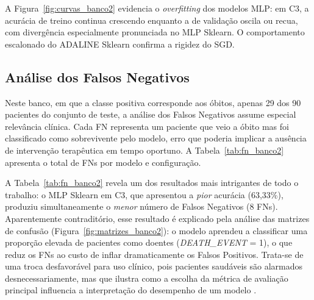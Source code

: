 A Figura~\ref{fig:curvas_banco2} evidencia o \textit{overfitting} dos modelos MLP: em C3, a acurácia de treino continua crescendo enquanto a de validação oscila ou recua, com divergência especialmente pronunciada no MLP Sklearn. O comportamento escalonado do ADALINE Sklearn confirma a rigidez do SGD.

\subsection{Análise dos Falsos Negativos}
\label{sec:banco2_fn}

Neste banco, em que a classe positiva corresponde aos óbitos, apenas 29 dos 90 pacientes do conjunto de teste, a análise dos Falsos Negativos assume especial relevância clínica. Cada FN representa um paciente que veio a óbito mas foi classificado como sobrevivente pelo modelo, erro que poderia implicar a ausência de intervenção terapêutica em tempo oportuno. A Tabela~\ref{tab:fn_banco2} apresenta o total de FNs por modelo e configuração.

\begin{table}[H]
\centering
\caption[Falsos Negativos dos modelos no Banco 2 por configuração]{Total de Falsos Negativos (FN) dos modelos no Banco 2 por configuração de treinamento. Conjunto de teste: 90 pacientes (29 óbitos / 61 sobreviventes).}
\label{tab:fn_banco2}
\end{table}

A Tabela~\ref{tab:fn_banco2} revela um dos resultados mais intrigantes de todo o trabalho: o MLP Sklearn em C3, que apresentou a \textit{pior} acurácia (63,33\%), produziu simultaneamente o \textit{menor} número de Falsos Negativos (8 FNs). Aparentemente contraditório, esse resultado é explicado pela análise das matrizes de confusão (Figura~\ref{fig:matrizes_banco2}): o modelo aprendeu a classificar uma proporção elevada de pacientes como doentes (\textit{DEATH\_EVENT} = 1), o que reduz os FNs ao custo de inflar dramaticamente os Falsos Positivos. Trata-se de uma troca desfavorável para uso clínico, pois pacientes saudáveis são alarmados desnecessariamente, mas que ilustra como a escolha da métrica de avaliação principal influencia a interpretação do desempenho de um modelo \cite{braga2007}.

